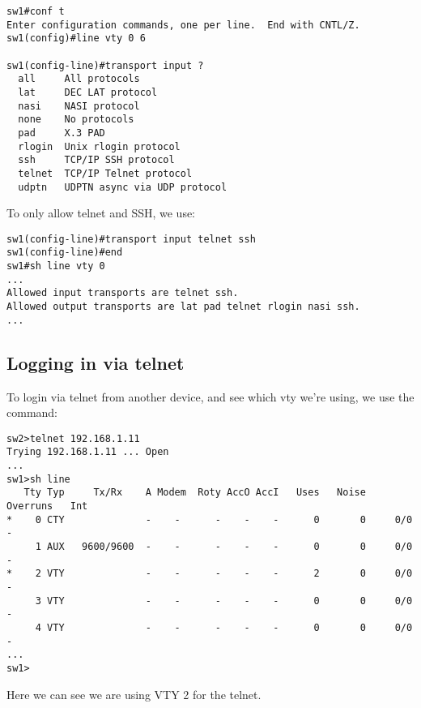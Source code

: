 \vspace{-15pt}
\begin{verbatim}
sw1#conf t
Enter configuration commands, one per line.  End with CNTL/Z.
sw1(config)#line vty 0 6

sw1(config-line)#transport input ?
  all     All protocols
  lat     DEC LAT protocol
  nasi    NASI protocol
  none    No protocols
  pad     X.3 PAD
  rlogin  Unix rlogin protocol
  ssh     TCP/IP SSH protocol
  telnet  TCP/IP Telnet protocol
  udptn   UDPTN async via UDP protocol

\end{verbatim}
\vspace{-10pt}

\noindent
To only allow telnet and SSH, we use:

\vspace{-15pt}
\begin{verbatim}
sw1(config-line)#transport input telnet ssh
sw1(config-line)#end
sw1#sh line vty 0
...
Allowed input transports are telnet ssh.
Allowed output transports are lat pad telnet rlogin nasi ssh.
...
\end{verbatim}
\vspace{-10pt}

\subsection{Logging in via telnet}
To login via telnet from another device, and see which vty we're using, we use the command: 

\vspace{-15pt}
\begin{verbatim}
sw2>telnet 192.168.1.11
Trying 192.168.1.11 ... Open
...
sw1>sh line
   Tty Typ     Tx/Rx    A Modem  Roty AccO AccI   Uses   Noise  Overruns   Int
*    0 CTY              -    -      -    -    -      0       0     0/0       -
     1 AUX   9600/9600  -    -      -    -    -      0       0     0/0       -
*    2 VTY              -    -      -    -    -      2       0     0/0       -
     3 VTY              -    -      -    -    -      0       0     0/0       -
     4 VTY              -    -      -    -    -      0       0     0/0       -
...
sw1>
\end{verbatim}
\vspace{-10pt}

\noindent
Here we can see we are using VTY 2 for the telnet. 

